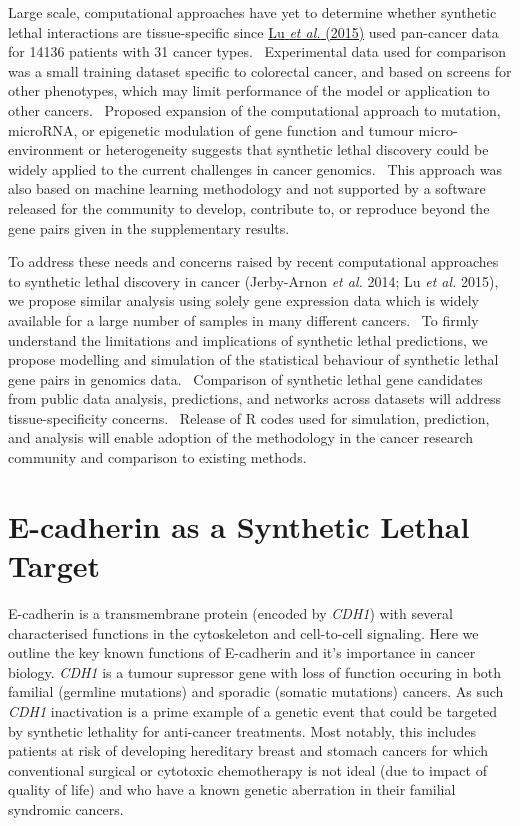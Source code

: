Large scale, computational approaches have yet to determine whether synthetic lethal interactions are tissue-specific since \hyperlink{ENREF74}{Lu}\hyperlink{ENREF74}{\textit{ et al.}}\hyperlink{ENREF74}{ (2015)} used pan-cancer data for 14136 patients with 31 cancer types. \ Experimental data used for comparison was a small training dataset specific to colorectal cancer, and based on screens for other phenotypes, which may limit performance of the model or application to other cancers. \ Proposed expansion of the computational approach to mutation, microRNA, or epigenetic modulation of gene function and tumour micro-environment or heterogeneity suggests that synthetic lethal discovery could be widely applied to the current challenges in cancer genomics. \ This approach was also based on machine learning methodology and not supported by a software released for the community to develop, contribute to, or reproduce beyond the gene pairs given in the supplementary results. 

To address these needs and concerns raised by recent computational approaches to synthetic lethal discovery in cancer (Jerby-Arnon\textit{ et al.} 2014; Lu\textit{ et al.} 2015), we propose similar analysis using solely gene expression data which is widely available for a large number of samples in many different cancers. \ To firmly understand the limitations and implications of synthetic lethal predictions, we propose modelling and simulation of the statistical behaviour of synthetic lethal gene pairs in genomics data. \ Comparison of synthetic lethal gene candidates from public data analysis, predictions, and networks across datasets will address tissue-specificity concerns. \ Release of R codes used for simulation, prediction, and analysis will enable adoption of the methodology in the cancer research community and comparison to existing methods. 


\section{E-cadherin as a Synthetic Lethal Target}

E-cadherin is a transmembrane protein (encoded by \textit{CDH1}) with several characterised functions in the cytoskeleton and cell-to-cell signaling. Here we outline the key known functions of E-cadherin and it's importance in cancer biology. \textit{CDH1} is a tumour supressor gene with loss of function occuring in both familial (germline mutations) and sporadic (somatic mutations) cancers. As such \textit{CDH1} inactivation is a prime example of a genetic event that could be targeted by synthetic lethality for anti-cancer treatments. Most notably, this includes patients at risk of developing hereditary breast and stomach cancers for which conventional surgical or cytotoxic chemotherapy is not ideal (due to impact of quality of life) and who have a known genetic aberration in their familial syndromic cancers.


